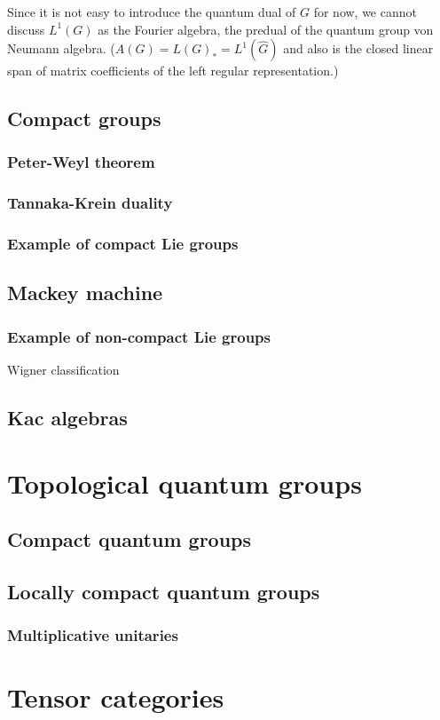 \documentclass{../../large}
\begin{document}
\begin{prb}
\end{prb}



Since it is not easy to introduce the quantum dual of $G$ for now, we cannot discuss $L^1(G)$ as the Fourier algebra, the predual of the quantum group von Neumann algebra.
($A(G)=L(G)_*=L^1(\hat G)$ and also is the closed linear span of matrix coefficients of the left regular representation.)



\chapter{Compact groups}
\section{Peter-Weyl theorem}
\section{Tannaka-Krein duality}
\section{Example of compact Lie groups}

\chapter{Mackey machine}
\section{Example of non-compact Lie groups}
Wigner classification








\chapter{Kac algebras}




\part{Topological quantum groups}
\chapter{Compact quantum groups}
\chapter{Locally compact quantum groups}
\section{Multiplicative unitaries}


\part{Tensor categories}
\end{document}
